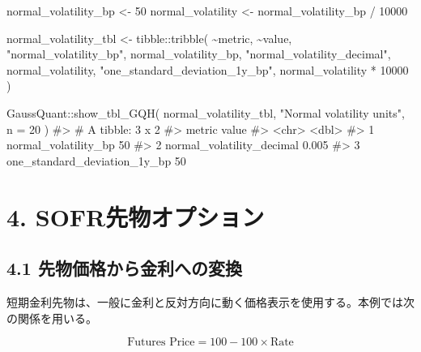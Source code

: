 \documentclass[
  letterpaper,
  DIV=11,
  numbers=noendperiod]{scrreprt}
\newenvironment{Shaded}{\begin{snugshade}}{\end{snugshade}}
\newcommand{\AttributeTok}[1]{\textcolor[rgb]{0.40,0.45,0.13}{#1}}
\newcommand{\CommentTok}[1]{\textcolor[rgb]{0.37,0.37,0.37}{#1}}
\newcommand{\DecValTok}[1]{\textcolor[rgb]{0.68,0.00,0.00}{#1}}
\newcommand{\FunctionTok}[1]{\textcolor[rgb]{0.28,0.35,0.67}{#1}}
\newcommand{\NormalTok}[1]{\textcolor[rgb]{0.00,0.23,0.31}{#1}}
\newcommand{\OtherTok}[1]{\textcolor[rgb]{0.00,0.23,0.31}{#1}}
\newcommand{\SpecialCharTok}[1]{\textcolor[rgb]{0.37,0.37,0.37}{#1}}
\newcommand{\StringTok}[1]{\textcolor[rgb]{0.13,0.47,0.30}{#1}}
\begin{document}
\begin{Shaded}
\begin{Highlighting}[]
\NormalTok{normal\_volatility\_bp }\OtherTok{\textless{}{-}} \DecValTok{50}
\NormalTok{normal\_volatility }\OtherTok{\textless{}{-}}\NormalTok{ normal\_volatility\_bp }\SpecialCharTok{/} \DecValTok{10000}

\NormalTok{normal\_volatility\_tbl }\OtherTok{\textless{}{-}}\NormalTok{ tibble}\SpecialCharTok{::}\FunctionTok{tribble}\NormalTok{(}
  \SpecialCharTok{\textasciitilde{}}\NormalTok{metric,                        }\SpecialCharTok{\textasciitilde{}}\NormalTok{value,}
  \StringTok{"normal\_volatility\_bp"}\NormalTok{,         normal\_volatility\_bp,}
  \StringTok{"normal\_volatility\_decimal"}\NormalTok{,    normal\_volatility,}
  \StringTok{"one\_standard\_deviation\_1y\_bp"}\NormalTok{, normal\_volatility }\SpecialCharTok{*} \DecValTok{10000}
\NormalTok{)}

\NormalTok{GaussQuant}\SpecialCharTok{::}\FunctionTok{show\_tbl\_GQH}\NormalTok{(}
\NormalTok{  normal\_volatility\_tbl,}
  \StringTok{"Normal volatility units"}\NormalTok{,}
  \AttributeTok{n =} \DecValTok{20}
\NormalTok{)}
\CommentTok{\#\textgreater{} \# A tibble: 3 x 2}
\CommentTok{\#\textgreater{}   metric                        value}
\CommentTok{\#\textgreater{}   \textless{}chr\textgreater{}                         \textless{}dbl\textgreater{}}
\CommentTok{\#\textgreater{} 1 normal\_volatility\_bp         50    }
\CommentTok{\#\textgreater{} 2 normal\_volatility\_decimal     0.005}
\CommentTok{\#\textgreater{} 3 one\_standard\_deviation\_1y\_bp 50}
\end{Highlighting}
\end{Shaded}

\section{4.
SOFR先物オプション}\label{sofrux5148ux7269ux30aaux30d7ux30b7ux30e7ux30f3}

\subsection{4.1
先物価格から金利への変換}\label{ux5148ux7269ux4fa1ux683cux304bux3089ux91d1ux5229ux3078ux306eux5909ux63db}

短期金利先物は、一般に金利と反対方向に動く価格表示を使用する。本例では次の関係を用いる。

\[
\text{Futures Price}
=
100
-
100\times\text{Rate}
\]
\end{document}
